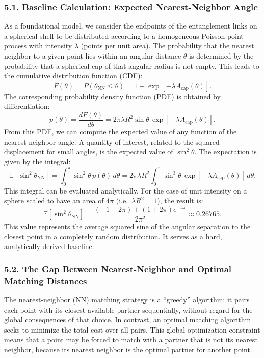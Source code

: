 \documentclass[11pt]{article}
\begin{document}
\subsubsection*{5.1. Baseline Calculation: Expected Nearest-Neighbor Angle}
As a foundational model, we consider the endpoints of the entanglement links on a spherical shell to be distributed according to a homogeneous Poisson point process with intensity $\lambda$ (points per unit area). The probability that the nearest neighbor to a given point lies within an angular distance $\theta$ is determined by the probability that a spherical cap of that angular radius is not empty. This leads to the cumulative distribution function (CDF):
\[
F(\theta) = P(\theta_{\mathrm{NN}} \le \theta) = 1 - \exp[-\lambda A_{\text{cap}}(\theta)].
\]
The corresponding probability density function (PDF) is obtained by differentiation:
\[
p(\theta) = \frac{dF(\theta)}{d\theta} = 2\pi \lambda R^2 \sin\theta \,\exp[-\lambda A_{\text{cap}}(\theta)].
\]
From this PDF, we can compute the expected value of any function of the nearest-neighbor angle. A quantity of interest, related to the squared displacement for small angles, is the expected value of $\sin^2\theta$. The expectation is given by the integral:
\[
\mathbb{E}[\sin^2\theta_{\mathrm{NN}}] = \int_0^\pi \sin^2\theta \, p(\theta) \, d\theta = 2\pi \lambda R^2 \int_0^\pi \sin^3\theta \,\exp[-\lambda A_{\text{cap}}(\theta)]\,d\theta.
\]
This integral can be evaluated analytically. For the case of unit intensity on a sphere scaled to have an area of $4\pi$ (i.e.\ $\lambda R^2 = 1$), the result is:
\[
\mathbb{E}[\sin^2\theta_{\mathrm{NN}}] = \frac{(-1 + 2\pi) + (1 + 2\pi)e^{-4\pi}}{2\pi^2} \approx 0.26765.
\]
This value represents the average squared sine of the angular separation to the closest point in a completely random distribution. It serves as a hard, analytically-derived baseline.

\subsubsection*{5.2. The Gap Between Nearest-Neighbor and Optimal Matching Distances}
The nearest-neighbor (NN) matching strategy is a “greedy” algorithm: it pairs each point with its closest available partner sequentially, without regard for the global consequences of that choice. In contrast, an optimal matching algorithm seeks to minimize the total cost over all pairs. This global optimization constraint means that a point may be forced to match with a partner that is not its nearest neighbor, because its nearest neighbor is the optimal partner for another point.
\end{document}
